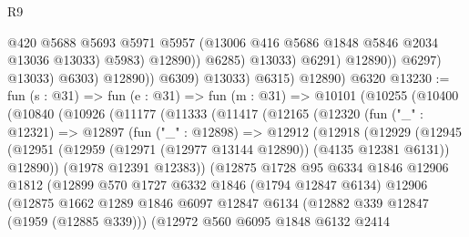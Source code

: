 \begin{lexlean}{R9}
\begin{coremodule}
                                      @420
                                      @5688
                                      @5693
                                      @5971
                                      @5957
                                      (@13006 @416 @5686 @1848 @5846 @2034 @13036 @13033)
                                      @5983)
                                    @12890))
                                @6285)
                              @13033)
                            @6291)
                          @12890))
                      @6297)
                    @13033)
                  @6303)
                @12890))
            @6309)
          @13033)
        @6315)
      @12890)
    @6320
@13230 := fun (s : @31) =>
  fun (e : @31) =>
  fun (m : @31) =>
  @10101
    (@10255
      (@10400
        (@10840
          (@10926
            (@11177
              (@11333
                (@11417
                  (@12165
                    (@12320
                      (fun ("_" : @12321) =>
                      @12897
                        (fun ("_" : @12898) =>
                        @12912
                          (@12918
                            (@12929
                              (@12945
                                (@12951
                                  (@12959 (@12971 (@12977 @13144 @12890)) (@4135 @12381 @6131))
                                  @12890))
                              (@1978 @12391 @12383))
                            (@12875
                              @1728
                              @95
                              @6334
                              @1846
                              @12906
                              @1812
                              (@12899
                                @570
                                @1727
                                @6332
                                @1846
                                (@1794 @12847 @6134)
                                @12906
                                (@12875
                                  @1662
                                  @1289
                                  @1846
                                  @6097
                                  @12847
                                  @6134
                                  (@12882 @339 @12847 (@1959 (@12885 @339)))
                                  (@12972
                                    @560
                                    @6095
                                    @1848
                                    @6132
                                    @2414

\end{coremodule}
\end{lexlean}
